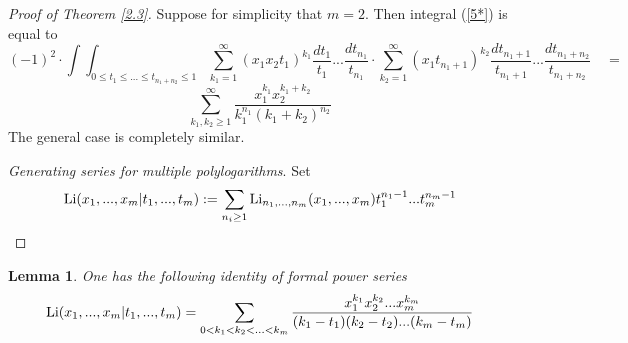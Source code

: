 \documentclass[10pt]{article}
\newtheorem{lemma}[theorem]{Lemma}
\begin{document}
\vskip 3mm \noindent
\begin{proof}[Proof of Theorem  \ref{2.3}] Suppose for simplicity that $m = 2$. Then integral (\ref{5*}) is equal to
$$
(-1)^2\cdot\int \int_{0 \leq t_1 \leq ... \leq t_{n_1 + n_2} \leq 1}\sum_{k_1 = 1}^{\infty} (x_1x_2t_1)^{k_1}\frac{dt_1}{t_1}  ...   \frac{dt_{n_1}}{t_{n_1}}\cdot
\sum_{k_2 = 1}^{\infty} (x_1t_{n_1+1})^{k_2}\frac{dt_{n_1 +1}}{t_{n_1 +1}}  ...   \frac{dt_{n_1 +n_2}}{t_{n_1 + n_2}} \quad =
$$
$$
\sum_{k_1,k_2 \geq 1}^{\infty} \frac{x_1^{k_1}x_2^{ k_1 + k_2}}
{ k_1^{n_1}(k_1 + k_2)^{n_2}}
$$
The general case is completely similar. 



{\it Generating series for multiple polylogarithms}. Set
$$
{\rm Li} (x_{1},...,x_{m}|t_1,...,t_m ) := \sum_{n_i \geq 1}{\rm Li}_{n_{1},...,n_{m}}(x_{1},...,x_{m} )t_1^{n_1-1}... t_m^{n_m-1}
$$


\end{proof}

 \begin{lemma}  \label{2.new}  
One has the following identity of formal power series
\begin{equation} \label{5.new}
{\rm Li} (x_{1},...,x_{m}|t_1,...,t_m ) 
=   
\sum_{0 < k_{1} < k_{2} < ... < k_{m} } \frac{x_{1}^{k_{1}}x_{2}^{k_{2}}
... x_{m}^{k_{m}}}{(k_{1} -t_1)(k_{2} -t_2) ... (k_{m} -t_m)}
\end{equation}
\end{lemma}
\end{document}
